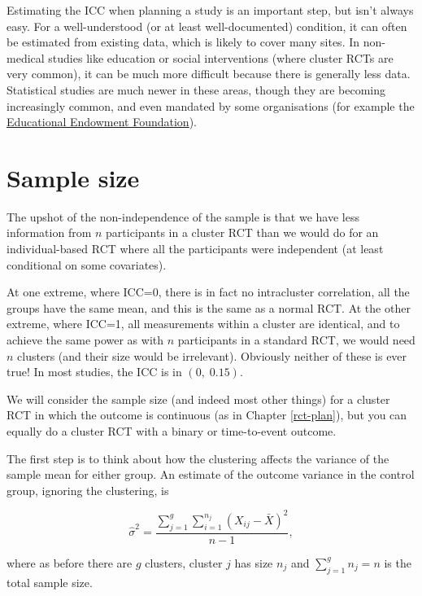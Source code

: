 \documentclass[
  openany]{book}
\theoremstyle{definition}
\theoremstyle{definition}
\theoremstyle{definition}
\theoremstyle{definition}
\theoremstyle{remark}
\begin{document}
Estimating the ICC when planning a study is an important step, but isn't always easy. For a well-understood (or at least well-documented) condition, it can often be estimated from existing data, which is likely to cover many sites. In non-medical studies like education or social interventions (where cluster RCTs are very common), it can be much more difficult because there is generally less data. Statistical studies are much newer in these areas, though they are becoming increasingly common, and even mandated by some organisations (for example the \href{https://educationendowmentfoundation.org.uk}{Educational Endowment Foundation}).

\section{Sample size}\label{sample-size}

The upshot of the non-independence of the sample is that we have less information from \(n\) participants in a cluster RCT than we would do for an individual-based RCT where all the participants were independent (at least conditional on some covariates).

At one extreme, where ICC=0, there is in fact no intracluster correlation, all the groups have the same mean, and this is the same as a normal RCT. At the other extreme, where ICC=1, all measurements within a cluster are identical, and to achieve the same power as with \(n\) participants in a standard RCT, we would need \(n\) clusters (and their size would be irrelevant). Obviously neither of these is ever true! In most studies, the ICC is in \(\left(0,\;0.15\right)\).

We will consider the sample size (and indeed most other things) for a cluster RCT in which the outcome is continuous (as in Chapter \ref{rct-plan}), but you can equally do a cluster RCT with a binary or time-to-event outcome.

The first step is to think about how the clustering affects the variance of the sample mean for either group. An estimate of the outcome variance in the control group, ignoring the clustering, is

\begin{equation}
\hat{\sigma}^2 = \frac{\sum\limits_{j=1}^g\sum\limits_{i=1}^{n_j}\left(X_{ij} - \bar{X}\right)^2}{n-1},
\label{eq:varcrt1}
\end{equation}

where as before there are \(g\) clusters, cluster \(j\) has size \(n_j\) and \(\sum\limits_{j=1}^gn_j=n\) is the total sample size.
\end{document}
